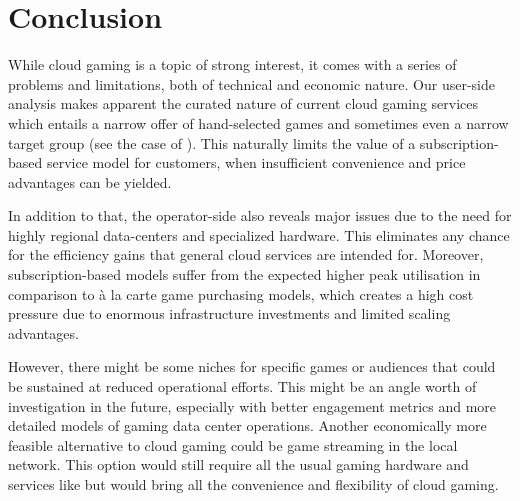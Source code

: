 \section{Conclusion}
\label{sec:conclusion}

While cloud gaming is a topic of strong interest, it comes with a series of problems and limitations, both of technical and economic nature. Our user-side analysis makes apparent the curated nature of current cloud gaming services which entails a narrow offer of hand-selected games and sometimes even a narrow target group (see the case of \psnow). This naturally limits the value of a subscription-based service model for customers, when insufficient convenience and price advantages can be yielded.

In addition to that, the operator-side also reveals major issues due to the need for highly regional data-centers and specialized hardware. This eliminates any chance for the efficiency gains that general cloud services are intended for. Moreover, subscription-based models suffer from the expected higher peak utilisation in comparison to à la carte game purchasing models, which creates a high cost pressure due to enormous infrastructure investments and limited scaling advantages.

However, there might be some niches for specific games or audiences that could be sustained at reduced operational efforts. This might be an angle worth of investigation in the future, especially with better engagement metrics and more detailed models of gaming data center operations. Another economically more feasible alternative to cloud gaming could be game streaming in the local network. This option would still require all the usual gaming hardware and services like \steam but would bring all the convenience and flexibility of cloud gaming.

